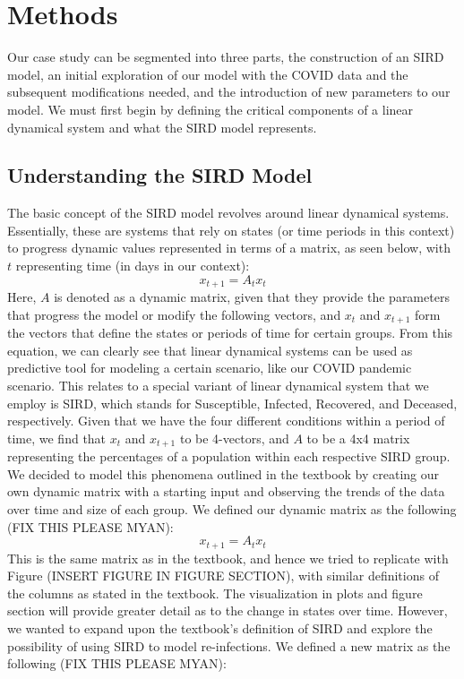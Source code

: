 \documentclass[conference]{IEEEtran}
\begin{document}
\section{Methods}
Our case study can be segmented into three parts, the construction of an SIRD model, an initial exploration of our model with the COVID data and the subsequent modifications needed, and the introduction of new parameters to our model. We must first begin by defining the critical components of a linear dynamical system and what the SIRD model represents.

\subsection{Understanding the SIRD Model}
The basic concept of the SIRD model revolves around linear dynamical systems. Essentially, these are systems that rely on states (or time periods in this context) to progress dynamic values represented in terms of a matrix, as seen below, with $t$ representing time (in days in our context):
\begin{equation}
    x_{t+1}=A_{t}x_{t} \label{eq}
\end{equation}
Here, $A$ is denoted as a dynamic matrix, given that they provide the parameters that progress the model or modify the following vectors, and $x_t$ and $x_{t+1}$ form the vectors that define the states or periods of time for certain groups. From this equation, we can clearly see that linear dynamical systems can be used as predictive tool for modeling a certain scenario, like our COVID pandemic scenario. This relates to a special variant of linear dynamical system that we employ is SIRD, which stands for Susceptible, Infected, Recovered, and Deceased, respectively. Given that we have the four different conditions within a period of time, we find that $x_t$ and $x_{t+1}$ to be 4-vectors, and $A$ to be a 4x4 matrix representing the percentages of a population within each respective SIRD group.
	We decided to model this phenomena outlined in the textbook by creating our own dynamic matrix with a starting input and observing the trends of the data over time and size of each group. We defined our dynamic matrix as the following (FIX THIS PLEASE MYAN):
\begin{equation}
    x_{t+1}=A_{t}x_{t} \label{eq}
\end{equation}
This is the same matrix as in the textbook, and hence we tried to replicate with Figure (INSERT FIGURE IN FIGURE SECTION), with similar definitions of the columns as stated in the textbook. The visualization in plots and figure section will provide greater detail as to the change in states over time. However, we wanted to expand upon the textbook's definition of SIRD and explore the possibility of using SIRD to model re-infections. We defined a new matrix as the following (FIX THIS PLEASE MYAN):
\end{document}

